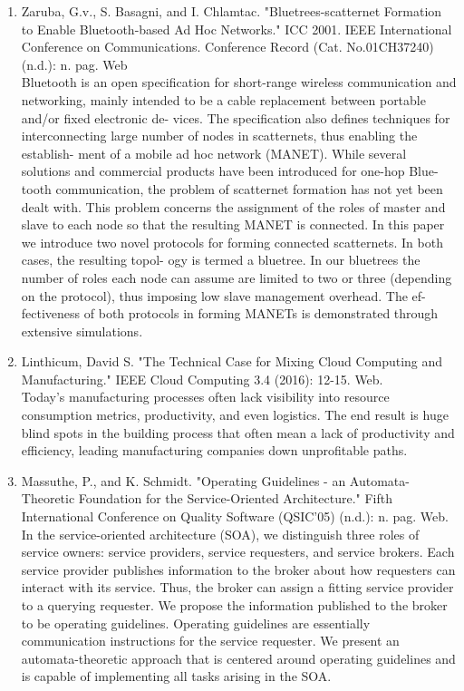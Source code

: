 \documentclass[oneside,a4paper,12pt]{report}
\begin{document}
\begin{enumerate}

\item Zaruba, G.v., S. Basagni, and I. Chlamtac. "Bluetrees-scatternet Formation to Enable Bluetooth-based Ad Hoc Networks." ICC 2001. IEEE International Conference on Communications. Conference Record (Cat. No.01CH37240) (n.d.): n. pag. Web\\
Bluetooth is an open specification for short-range
wireless communication and networking, mainly intended to be
a cable replacement between portable and/or fixed electronic de-
vices. The specification also defines techniques for interconnecting
large number of nodes in scatternets, thus enabling the establish-
ment of a mobile ad hoc network (MANET). While several solutions
and commercial products have been introduced for one-hop Blue-
tooth communication, the problem of scatternet formation has not
yet been dealt with. This problem concerns the assignment of the
roles of master and slave to each node so that the resulting MANET
is connected. In this paper we introduce two novel protocols for
forming connected scatternets. In both cases, the resulting topol-
ogy is termed a bluetree. In our bluetrees the number of roles each
node can assume are limited to two or three (depending on the
protocol), thus imposing low slave management overhead. The ef-
fectiveness of both protocols in forming MANETs is demonstrated
through extensive simulations.\\
\item Linthicum, David S. "The Technical Case for Mixing Cloud Computing and Manufacturing." IEEE Cloud Computing 3.4 (2016): 12-15. Web.\\
Today’s manufacturing processes often lack visibility into resource consumption metrics, productivity, and even logistics. The end result is huge blind spots in the building process that often mean a lack of productivity and efficiency, leading manufacturing companies down unprofitable paths.\\
\item Massuthe, P., and K. Schmidt. "Operating Guidelines - an Automata-Theoretic Foundation for the Service-Oriented Architecture." Fifth International Conference on Quality Software (QSIC'05) (n.d.): n. pag. Web.\\
In the service-oriented architecture (SOA), we distinguish three roles of service owners: service providers, service requesters, and service brokers. Each service provider publishes information to the broker about how requesters can interact with its service. Thus, the broker can assign a fitting service provider to a querying requester. We propose the information published to the broker to be operating guidelines. Operating guidelines are essentially communication instructions for the service requester.
We present an automata-theoretic approach that is centered around operating guidelines and is capable of implementing all tasks arising in the SOA.\\


\end{enumerate}
\end{document}
